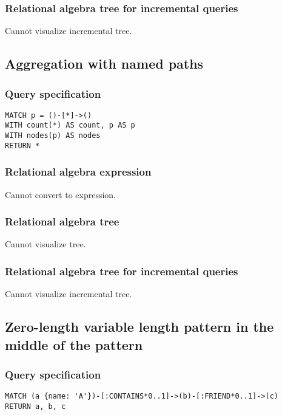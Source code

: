 \subsubsection*{Relational algebra tree for incremental queries}

Cannot visualize incremental tree.

\subsection{Aggregation with named paths}

\subsubsection*{Query specification}

\begin{lstlisting}
MATCH p = ()-[*]->()
WITH count(*) AS count, p AS p
WITH nodes(p) AS nodes
RETURN *
\end{lstlisting}

\subsubsection*{Relational algebra expression}

Cannot convert to expression.

\subsubsection*{Relational algebra tree}

Cannot visualize tree.

\subsubsection*{Relational algebra tree for incremental queries}

Cannot visualize incremental tree.

\subsection{Zero-length variable length pattern in the middle of the pattern}

\subsubsection*{Query specification}

\begin{lstlisting}
MATCH (a {name: 'A'})-[:CONTAINS*0..1]->(b)-[:FRIEND*0..1]->(c)
RETURN a, b, c
\end{lstlisting}


